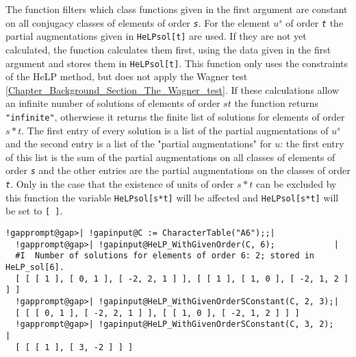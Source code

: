 \documentclass[a4paper,11pt]{report}
\begin{document}
{{{ The function filters which class functions given in the first argument are
constant on all conjugacy classes of elements of order \mbox{\texttt{\mdseries\slshape s}}. For the element $u^s$ of order \mbox{\texttt{\mdseries\slshape t}} the partial augmentations given in \texttt{HeLP{\textunderscore}sol[t]} are used. If they are not yet calculated, the function calculates them first,
using the data given in the first argument and stores them in \texttt{HeLP{\textunderscore}sol[t]}. This function only uses the constraints of the HeLP method, but does not
apply the Wagner test \ref{Chapter_Background_Section_The_Wagner_test}. If these calculations allow an infinite number of solutions of elements of
order $st$ the function returns \texttt{"infinite"}, otherwiese it returns the finite list of solutions for elements of order $s*t$. The first entry of every solution is a list of the partial augmentations of $u^s$ and the second entry is a list of the "partial augmentations" for $u$: the first entry of this list is the sum of the partial augmentations on all
classes of elements of order \mbox{\texttt{\mdseries\slshape s}} and the other entries are the partial augmentations on the classes of order \mbox{\texttt{\mdseries\slshape t}}. Only in the case that the existence of units of order $s*t$ can be excluded by this function the variable \texttt{HeLP{\textunderscore}sol[s*t]} will be affected and \texttt{HeLP{\textunderscore}sol[s*t]} will be set to \texttt{[ ]}. }

 
\begin{Verbatim}[commandchars=!@|,fontsize=\small,frame=single,label=Example]
  !gapprompt@gap>| !gapinput@C := CharacterTable("A6");;|
  !gapprompt@gap>| !gapinput@HeLP_WithGivenOrder(C, 6);            |
  #I  Number of solutions for elements of order 6: 2; stored in HeLP_sol[6].
  [ [ [ 1 ], [ 0, 1 ], [ -2, 2, 1 ] ], [ [ 1 ], [ 1, 0 ], [ -2, 1, 2 ] ] ]
  !gapprompt@gap>| !gapinput@HeLP_WithGivenOrderSConstant(C, 2, 3);|
  [ [ [ 0, 1 ], [ -2, 2, 1 ] ], [ [ 1, 0 ], [ -2, 1, 2 ] ] ]
  !gapprompt@gap>| !gapinput@HeLP_WithGivenOrderSConstant(C, 3, 2);     |
  [ [ [ 1 ], [ 3, -2 ] ] ]
\end{Verbatim}
 
}}
\end{document}
